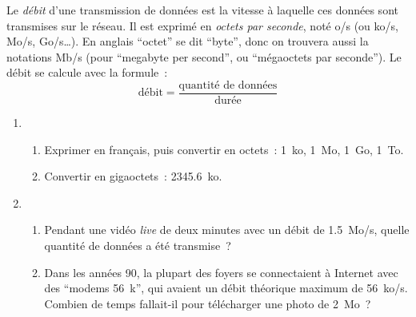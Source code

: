 \documentclass[12pt]{article}
\begin{document}
Le \emph{débit} d'une transmission de données est la vitesse à laquelle ces données sont transmises sur le réseau. Il est exprimé en \emph{octets par seconde}, noté \si{o/s} (ou \si{ko/s}, \si{Mo/s}, \si{Go/s}…). En anglais \enquote{octet} se dit \enquote{byte}, donc on trouvera aussi la notations \si{Mb/s} (pour \enquote{megabyte per second}, ou \enquote{mégaoctets par seconde}). Le débit se calcule avec la formule :
\[
  \text{débit}=\frac{\text{quantité de données}}{\text{durée}}
\]

\begin{enumerate}
  \item
    \begin{enumerate}
      \item Exprimer en français, puis convertir en octets : \SI{1}{ko}, \SI{1}{Mo}, \SI{1}{Go}, \SI{1}{To}.
      \item Convertir en gigaoctets : \SI{2345,6}{ko}.
    \end{enumerate}
  \item
    \begin{enumerate}
  \item Pendant une vidéo \emph{live} de deux minutes avec un débit de \SI{1,5}{Mo/s}, quelle quantité de données a été transmise ?
  \item Dans les années 90, la plupart des foyers se connectaient à Internet avec des \enquote{modems \SI{56}{k}}, qui avaient un débit théorique maximum de \SI{56}{ko/s}. Combien de temps fallait-il pour télécharger une photo de \SI{2}{Mo} ?
    \end{enumerate}
\end{enumerate}
\end{document}
